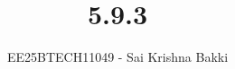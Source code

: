 \documentclass[journal]{IEEEtran}
\begin{document}

\vspace{3cm}

\title{5.9.3}
\author{EE25BTECH11049 - Sai Krishna Bakki}
 \maketitle
\vspace{-3em}
{\let\newpage\relax\maketitle}

\renewcommand{\thefigure}{\theenumi}
\renewcommand{\thetable}{\theenumi}
\setlength{\intextsep}{10pt} %


\renewcommand{\thetable}{\theenumi}
\end{document}
